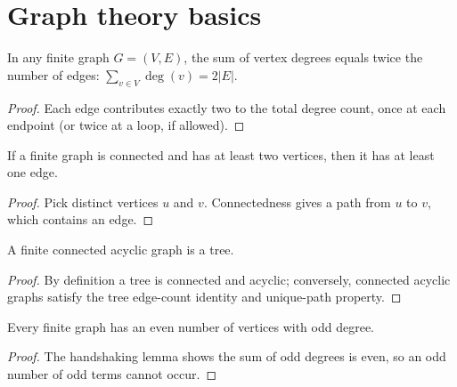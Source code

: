 
\section{Graph theory basics}

\begin{theorem}
In any finite graph $G=(V,E)$, the sum of vertex degrees equals twice the number of edges: $\sum_{v \in V} \deg(v) = 2|E|$.
\end{theorem}

\begin{proof}
Each edge contributes exactly two to the total degree count, once at each endpoint (or twice at a loop, if allowed).
\end{proof}

\begin{lemma}
If a finite graph is connected and has at least two vertices, then it has at least one edge.
\end{lemma}

\begin{proof}
Pick distinct vertices $u$ and $v$. Connectedness gives a path from $u$ to $v$, which contains an edge.
\end{proof}

\begin{proposition}
A finite connected acyclic graph is a tree.
\end{proposition}

\begin{proof}
By definition a tree is connected and acyclic; conversely, connected acyclic graphs satisfy the tree edge-count identity and unique-path property.
\end{proof}

\begin{corollary}
Every finite graph has an even number of vertices with odd degree.
\end{corollary}

\begin{proof}
The handshaking lemma shows the sum of odd degrees is even, so an odd number of odd terms cannot occur.
\end{proof}

